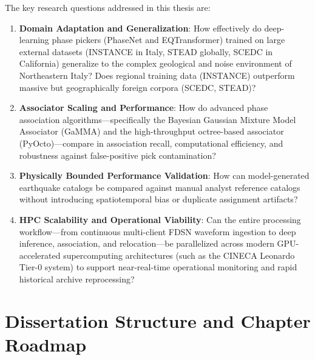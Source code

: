 The key research questions addressed in this thesis are:
\begin{enumerate}
  \item \textbf{Domain Adaptation and Generalization}: How effectively do deep-learning phase pickers (PhaseNet and EQTransformer) trained on large external datasets (INSTANCE in Italy, STEAD globally, SCEDC in California) generalize to the complex geological and noise environment of Northeastern Italy? Does regional training data (INSTANCE) outperform massive but geographically foreign corpora (SCEDC, STEAD)?
  \item \textbf{Associator Scaling and Performance}: How do advanced phase association algorithms—specifically the Bayesian Gaussian Mixture Model Associator (\ac{GaMMA}) and the high-throughput octree-based associator (\ac{PyOcto})—compare in association recall, computational efficiency, and robustness against false-positive pick contamination?
  \item \textbf{Physically Bounded Performance Validation}: How can model-generated earthquake catalogs be compared against manual analyst reference catalogs without introducing spatiotemporal bias or duplicate assignment artifacts?
  \item \textbf{HPC Scalability and Operational Viability}: Can the entire processing workflow—from continuous multi-client FDSN waveform ingestion to deep inference, association, and relocation—be parallelized across modern GPU-accelerated supercomputing architectures (such as the CINECA Leonardo Tier-0 system) to support near-real-time operational monitoring and rapid historical archive reprocessing?
\end{enumerate}

\section{Dissertation Structure and Chapter Roadmap}
\label{sec:roadmap}

